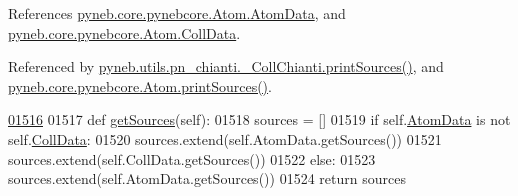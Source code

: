 References \hyperlink{pynebcore_8py_source_l01238}{pyneb.\-core.\-pynebcore.\-Atom.\-Atom\-Data}, and \hyperlink{pynebcore_8py_source_l01266}{pyneb.\-core.\-pynebcore.\-Atom.\-Coll\-Data}.



Referenced by \hyperlink{pn__chianti_8py_source_l00581}{pyneb.\-utils.\-pn\-\_\-chianti.\-\_\-\-Coll\-Chianti.\-print\-Sources()}, and \hyperlink{pynebcore_8py_source_l01511}{pyneb.\-core.\-pynebcore.\-Atom.\-print\-Sources()}.


\begin{DoxyCode}
\hypertarget{classpyneb_1_1core_1_1pynebcore_1_1_atom_l01516}{}\hyperlink{classpyneb_1_1core_1_1pynebcore_1_1_atom_a494480eb44909d9a13ed1fb2e808b4a2}{01516} 
01517     \textcolor{keyword}{def }\hyperlink{classpyneb_1_1core_1_1pynebcore_1_1_atom_a494480eb44909d9a13ed1fb2e808b4a2}{getSources}(self):
01518         sources = []
01519         \textcolor{keywordflow}{if} self.\hyperlink{classpyneb_1_1core_1_1pynebcore_1_1_atom_a7246a8b1ce71eb9d38f580a6ca9fe09e}{AtomData} \textcolor{keywordflow}{is} \textcolor{keywordflow}{not} self.\hyperlink{classpyneb_1_1core_1_1pynebcore_1_1_atom_a976816067ec07396b4e27cfccbf15573}{CollData}:
01520             sources.extend(self.AtomData.getSources())
01521             sources.extend(self.CollData.getSources())
01522         \textcolor{keywordflow}{else}:
01523             sources.extend(self.AtomData.getSources())
01524         \textcolor{keywordflow}{return} sources
    
\end{DoxyCode}
